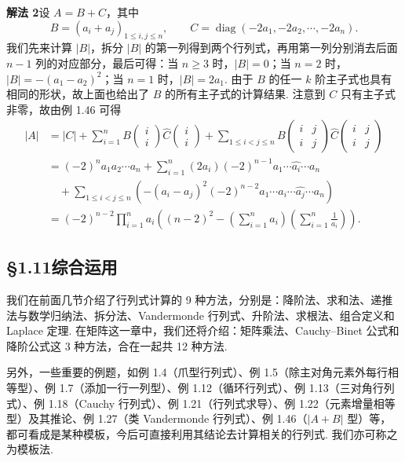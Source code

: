 \documentclass[UTF8, 12pt, fontset=fandol, oneside]{ctexart}
\begin{document}
\noindent\textbf{解法 2}\quad 设 $A=B+C$，其中
\[
B=(a_i+a_j)_{1\le i,j\le n},\qquad C=\operatorname{diag}(-2a_1,-2a_2,\cdots,-2a_n).
\]
我们先来计算 $|B|$，拆分 $|B|$ 的第一列得到两个行列式，再用第一列分别消去后面 $n-1$ 列的对应部分，最后可得：当 $n\ge3$ 时，$|B|=0$；当 $n=2$ 时，$|B|=-(a_1-a_2)^2$；当 $n=1$ 时，$|B|=2a_1$. 由于 $B$ 的任一 $k$ 阶主子式也具有相同的形状，故上面也给出了 $B$ 的所有主子式的计算结果. 注意到 $C$ 只有主子式非零，故由例 1.46 可得
\[
\begin{aligned}
|A|
&=|C|+\sum_{i=1}^n B\begin{pmatrix}i\\ i\end{pmatrix}\widehat{C}\begin{pmatrix}i\\ i\end{pmatrix}
+\sum_{1\le i<j\le n}B\begin{pmatrix}i&j\\ i&j\end{pmatrix}\widehat{C}\begin{pmatrix}i&j\\ i&j\end{pmatrix}\\
&=(-2)^na_1a_2\cdots a_n+\sum_{i=1}^n(2a_i)(-2)^{n-1}a_1\cdots\widehat{a_i}\cdots a_n\\
&\quad+\sum_{1\le i<j\le n}\left(-(a_i-a_j)^2(-2)^{n-2}a_1\cdots\widehat{a_i}\cdots\widehat{a_j}\cdots a_n\right)\\
&=(-2)^{n-2}\prod_{i=1}^n a_i
\left((n-2)^2-\left(\sum_{i=1}^n a_i\right)\left(\sum_{i=1}^n\frac1{a_i}\right)\right).
\end{aligned}
\]

\subsection*{§1.11\quad 综合运用}

我们在前面几节介绍了行列式计算的 9 种方法，分别是：降阶法、求和法、递推法与数学归纳法、拆分法、Vandermonde 行列式、升阶法、求根法、组合定义和 Laplace 定理. 在矩阵这一章中，我们还将介绍：矩阵乘法、Cauchy--Binet 公式和降阶公式这 3 种方法，合在一起共 12 种方法.

另外，一些重要的例题，如例 1.4（爪型行列式）、例 1.5（除主对角元素外每行相等型）、例 1.7（添加一行一列型）、例 1.12（循环行列式）、例 1.13（三对角行列式）、例 1.18（Cauchy 行列式）、例 1.21（行列式求导）、例 1.22（元素增量相等型）及其推论、例 1.27（类 Vandermonde 行列式）、例 1.46（$|A+B|$ 型）等，都可看成是某种模板，今后可直接利用其结论去计算相关的行列式. 我们亦可称之为模板法.
\end{document}
